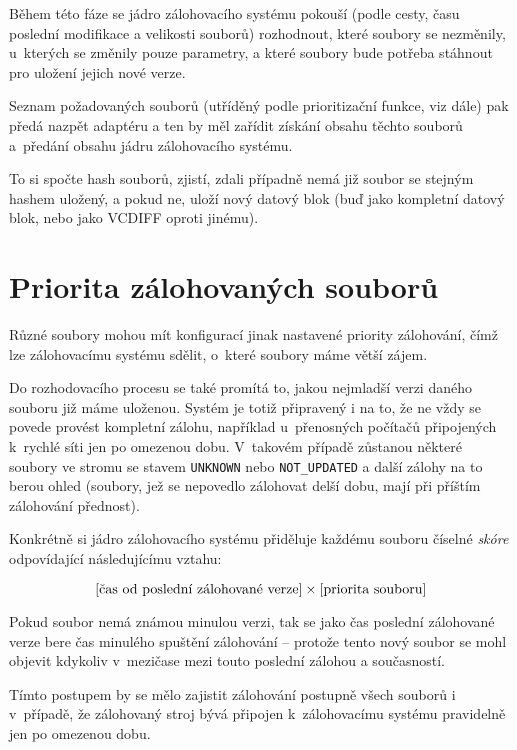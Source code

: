 Během této fáze se jádro zálohovacího systému pokouší (podle cesty, času poslední
modifikace a velikosti souborů) rozhodnout, které soubory se nezměnily, u~kterých
se změnily pouze parametry, a které soubory bude potřeba stáhnout pro uložení
jejich nové verze.

Seznam požadovaných souborů (utříděný podle prioritizační funkce, viz dále) pak
předá nazpět adaptéru a ten by měl zařídit získání obsahu těchto souborů
a~předání obsahu jádru zálohovacího systému.

To si spočte hash souborů, zjistí, zdali případně nemá již soubor se stejným
hashem uložený, a pokud ne, uloží nový datový blok (buď jako kompletní datový
blok, nebo jako \gls{VCDIFF} oproti jinému).

\section{Priorita zálohovaných souborů}

Různé soubory mohou mít konfigurací jinak nastavené priority zálohování, čímž
lze zálohovacímu systému sdělit, o~které soubory máme větší zájem.

Do rozhodovacího procesu se také promítá to, jakou nejmladší verzi daného
souboru již máme uloženou. Systém je totiž připravený i na to, že ne vždy se
povede provést kompletní zálohu, například u~přenosných počítačů připojených
k~rychlé síti jen po omezenou dobu. V~takovém případě zůstanou některé soubory ve
stromu se stavem \texttt{UNKNOWN} nebo \texttt{NOT\_UPDATED} a další zálohy na
to berou ohled (soubory, jež se nepovedlo zálohovat delší dobu, mají při příštím
zálohování přednost).

Konkrétně si jádro zálohovacího systému přiděluje každému souboru číselné
{\it skóre} odpovídající následujícímu vztahu:

$$[\hbox{čas od poslední zálohované verze}]\times[\hbox{priorita souboru}]$$

Pokud soubor nemá známou minulou verzi, tak se jako čas poslední zálohované
verze bere čas minulého spuštění zálohování -- protože tento nový soubor se mohl
objevit kdykoliv v~mezičase mezi touto poslední zálohou a současností.

Tímto postupem by se mělo zajistit zálohování postupně všech souborů i v~případě,
že zálohovaný stroj bývá připojen k~zálohovacímu systému pravidelně jen po
omezenou dobu.
